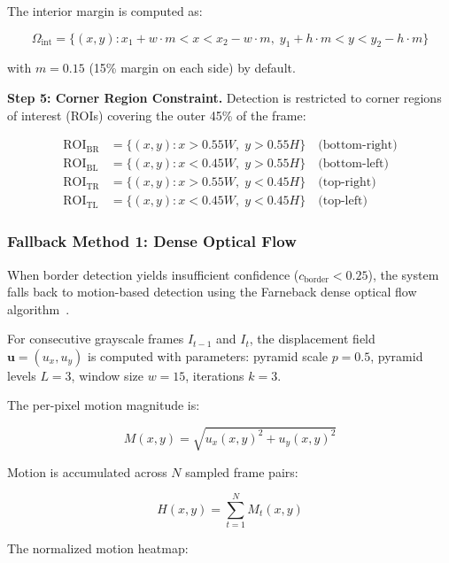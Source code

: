 \documentclass[journal]{IEEEtran}
\begin{document}
The interior margin is computed as:

\begin{equation}
\Omega_{\text{int}} = \{(x, y) : x_1 + w \cdot m < x < x_2 - w \cdot m, \; y_1 + h \cdot m < y < y_2 - h \cdot m\}
\end{equation}

with $m = 0.15$ (15\% margin on each side) by default.

\textbf{Step 5: Corner Region Constraint.} Detection is restricted to corner regions of interest (ROIs) covering the outer 45\% of the frame:

\begin{align}
\text{ROI}_{\text{BR}} &= \{(x, y) : x > 0.55W, \; y > 0.55H\} \quad \text{(bottom-right)} \\
\text{ROI}_{\text{BL}} &= \{(x, y) : x < 0.45W, \; y > 0.55H\} \quad \text{(bottom-left)} \\
\text{ROI}_{\text{TR}} &= \{(x, y) : x > 0.55W, \; y < 0.45H\} \quad \text{(top-right)} \\
\text{ROI}_{\text{TL}} &= \{(x, y) : x < 0.45W, \; y < 0.45H\} \quad \text{(top-left)}
\end{align}

\subsubsection{Fallback Method 1: Dense Optical Flow}

When border detection yields insufficient confidence ($c_{\text{border}} < 0.25$), the system falls back to motion-based detection using the Farneback dense optical flow algorithm~\cite{farneback2003two}.

For consecutive grayscale frames $I_{t-1}$ and $I_t$, the displacement field $\mathbf{u} = (u_x, u_y)$ is computed with parameters: pyramid scale $p = 0.5$, pyramid levels $L = 3$, window size $w = 15$, iterations $k = 3$.

The per-pixel motion magnitude is:

\begin{equation}
M(x, y) = \sqrt{u_x(x, y)^2 + u_y(x, y)^2}
\end{equation}

Motion is accumulated across $N$ sampled frame pairs:

\begin{equation}
H(x, y) = \sum_{t=1}^{N} M_t(x, y)
\end{equation}

The normalized motion heatmap:
\end{document}

